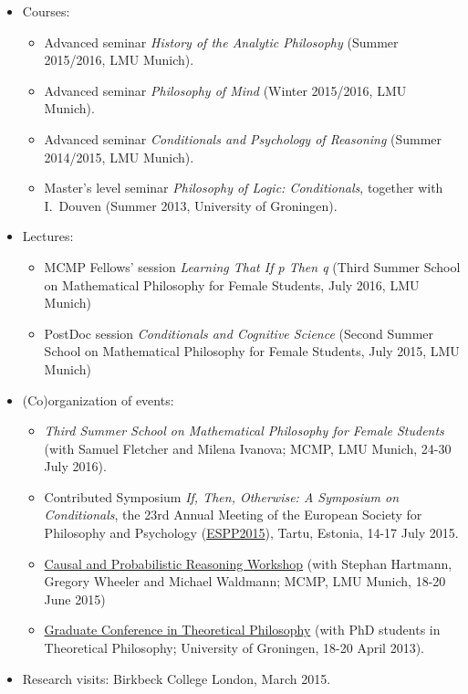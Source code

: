 \documentclass[a4paper,12pt]{article}
\begin{document}
\begin{small}
  
  \begin{itemize}
    \item Courses:
      \begin{itemize}
        \item Advanced seminar \emph{History of the Analytic Philosophy} (Summer 2015/2016, LMU Munich).
        \item Advanced seminar \emph{Philosophy of Mind} (Winter 2015/2016, LMU Munich).
        \item Advanced seminar \emph{Conditionals and Psychology of Reasoning} (Summer 2014/2015, LMU Munich).
        \item Master's level seminar \emph{Philosophy of Logic: Conditionals}, together with I.~Douven (Summer 2013, University of Groningen).
     \end{itemize}
    \item Lectures:
      \begin{itemize}
         \item MCMP Fellows' session \emph{Learning That If p Then q} (Third Summer School on Mathematical Philosophy for Female Students, July 2016, LMU Munich)
         \item PostDoc session \emph{Conditionals and Cognitive Science} (Second Summer School on Mathematical Philosophy for Female Students, July 2015, LMU Munich)
      \end{itemize}
  \end{itemize}
  


  \begin{itemize}
  	\item (Co)organization of events:
  		\begin{itemize}
		  \item \emph{Third Summer School on Mathematical Philosophy for Female Students} (with Samuel Fletcher and Milena Ivanova; MCMP, LMU Munich, 24-30 July 2016).
		  \item Contributed Symposium \emph{If, Then, Otherwise: A Symposium on Conditionals}, the 23rd Annual Meeting of the European Society for Philosophy and Psychology (\href{http://espp2015.ut.ee}{ESPP2015}), Tartu, Estonia, 14-17 July 2015.
		  \item \href{http://lmu.de/cpr2015}{Causal and Probabilistic Reasoning Workshop} (with Stephan Hartmann, Gregory Wheeler and Michael Waldmann; MCMP, LMU Munich, 18-20 June 2015)
		  \item  \href{http://www.philos.rug.nl/GCTP2013/}{Graduate Conference in
	      Theoretical Philosophy} (with PhD students in Theoretical Philosophy; University of Groningen, 18-20 April 2013).
  		\end{itemize}
  	\item Research visits: Birkbeck College London, March 2015.


\end{itemize}
\end{small}
\end{document}
